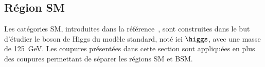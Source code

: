 \subsection{Région \og SM \fg{}}\label{chapter-HTT_analysis-section-categorisation-SM}
Les catégories SM, introduites dans la référence~\cite{CMS-PAS-HIG-19-010}, sont construites dans le but d'étudier le boson de Higgs du modèle standard, noté ici $\higgs$, avec une masse de \SI{125}{\GeV}.
Les coupures présentées dans cette section sont appliquées en plus des coupures permettant de séparer les régions SM et BSM.
\par


